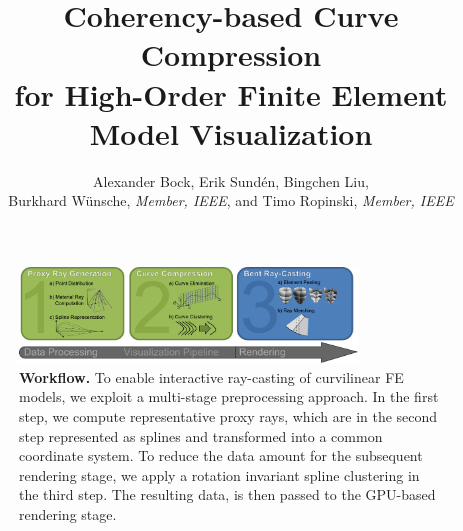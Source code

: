 \documentclass[journal]{vgtc}                %
\title{Coherency-based Curve Compression\\ for High-Order Finite Element Model Visualization}
\author{Alexander Bock, Erik Sund\'en, Bingchen Liu,\\Burkhard W{\"u}nsche, \textit{Member, IEEE}, and Timo Ropinski, \textit{Member, IEEE}}
\begin{document}

\label{sec:introduction}

\maketitle

\begin{figure}[t]
    \centering
    \includegraphics[width=0.8\textwidth]{figures/workflow-new.pdf}
    \caption{\textbf{Workflow.} To enable interactive ray-casting of curvilinear FE models, we exploit a multi-stage preprocessing approach. In the first step, we compute representative proxy rays, which are in the second step represented as splines and transformed into a common coordinate system. To reduce the data amount for the subsequent rendering stage, we apply a rotation invariant spline clustering in the third step. The resulting data, is then passed to the GPU-based rendering stage.}
    \label{fig:workflow}
\end{figure}
\end{document}
